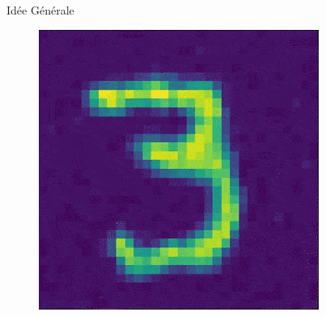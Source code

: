 \documentclass{beamer}
\begin{document}
\begin{frame}{Idée Générale}
{\begin{figure}
\begin{minipage}{0.2\textwidth}
					\includegraphics[width=\textwidth]{imgs/frame1.png}
				\end{minipage}%
\end{figure}}
\end{frame}
\end{document}
